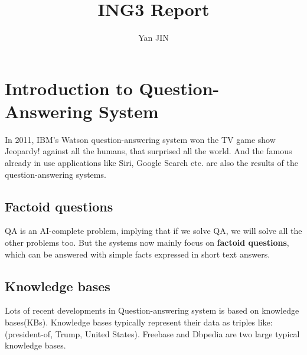 \documentclass[12pt]{article}
\numberwithin{equation}{section}
\begin{document}
\small
\title{ING3 Report}
\author{Yan JIN}
\pagestyle{fancy}\fancyhf{}
\lhead{}
\lfoot{\textit{}}\cfoot{}\rfoot{\thepage}
\renewcommand{\headrulewidth}{1.pt}
\renewcommand{\footrulewidth}{1.pt}
\maketitle
\tableofcontents
\section{Introduction to Question-Answering System}
	In 2011, IBM's Watson question-answering system won the TV game show Jeopardy! against all the humans, that surprised all the world. And the famous already in use applications like Siri, Google Search etc. are also the results of the question-answering systems.  \par
\subsection{Factoid questions}
	QA is an AI-complete problem, implying that if we solve QA, we will solve all the other problems too. But the systems now mainly focus on \textbf{factoid questions}, which can be answered with simple facts expressed in short text answers. \par
\subsection{Knowledge bases}
	Lots of recent developments in Question-answering system is based on knowledge bases(KBs)\citep{unger2014introduction}. Knowledge bases typically represent their data as triples like: (president-of, Trump, United States). Freebase and Dbpedia are two large typical knowledge bases.\par
\end{document}
